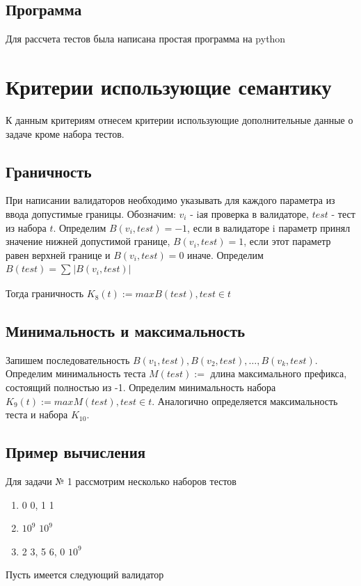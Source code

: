 \documentclass{article}
\begin{document}
\subsection{Программа}
    Для рассчета тестов была написана простая программа на python
    

\section{Критерии использующие семантику}
    
    К данным критериям отнесем критерии использующие дополнительные данные о задаче кроме набора тестов.
\subsection{Граничность}
    При написании валидаторов необходимо указывать для каждого параметра из ввода допустимые границы. Обозначим: \(v_i\) - iая
    проверка в валидаторе, \(test\) - тест из набора \(t\). Определим
    \(B(v_i, test) = -1\), если в валидаторе i параметр принял значение нижней допустимой границе, \(B(v_i, test) = 1\), 
    если этот параметр равен верхней границе и \(B(v_i, test) = 0\) иначе.
    Определим \(B(test) = \sum_{}^{}|B(v_i, test)|  \)

    Тогда граничность \(K_8(t) := max B(test), test \in t\)
\subsection{Минимальность и максимальность}
    Запишем последовательность \(B(v_1,test),B(v_2,test),\ldots, B(v_k,test)\).
    Определим минимальность теста \(M(test) := \) длина максимального префикса, состоящий полностью из -1. Определим
    минимальность набора \(K_9(t) := max M(test), test \in t\). Аналогично определяется максимальность теста и набора \(K_{10}\).
\subsection{Пример вычисления}
    Для задачи № 1 рассмотрим несколько наборов тестов
\begin{enumerate}
\item 0 0, 1 1
\item \(10^9\) \(10^9\)
\item 2 3, 5 6, 0 \(10^9\)
\end{enumerate}  

    Пусть имеется следующий валидатор
\end{document}
